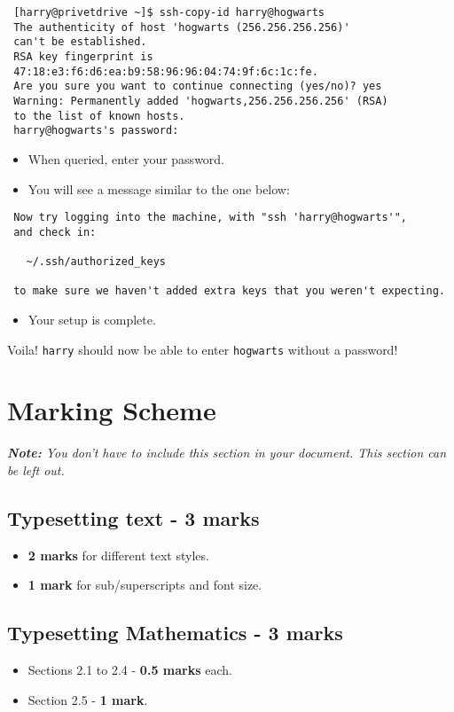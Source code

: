 \documentclass[a4paper,10pt,titlepage]{article}
\begin{document}
\begin{verbatim}
 [harry@privetdrive ~]$ ssh-copy-id harry@hogwarts
 The authenticity of host 'hogwarts (256.256.256.256)'
 can't be established.
 RSA key fingerprint is
 47:18:e3:f6:d6:ea:b9:58:96:96:04:74:9f:6c:1c:fe.
 Are you sure you want to continue connecting (yes/no)? yes
 Warning: Permanently added 'hogwarts,256.256.256.256' (RSA)
 to the list of known hosts.
 harry@hogwarts's password:
\end{verbatim}

\begin{itemize}
\item When queried, enter your password.
\item You will see a message similar to the one below:
\end{itemize}

\begin{verbatim}
 Now try logging into the machine, with "ssh 'harry@hogwarts'",
 and check in:

   ~/.ssh/authorized_keys

 to make sure we haven't added extra keys that you weren't expecting.

\end{verbatim}

\begin{itemize}
\item Your setup is complete.
\end{itemize}

Voila! \texttt{harry} should now be able to enter \texttt{hogwarts} without a password!

\newpage
\section{Marking Scheme}
\textit{\textbf{Note:} You don't have to include this section in your
document. This section can be left out.}
\subsection{Typesetting text - 3 marks}
\begin{itemize}
 \item \textbf{2 marks} for different text styles.
 \item \textbf{1 mark} for sub/superscripts and font size.
\end{itemize}

\subsection{Typesetting Mathematics - 3 marks}
\begin{itemize}
 \item Sections 2.1 to 2.4 - \textbf{0.5 marks} each.
 \item Section 2.5 - \textbf{1 mark}.
\end{itemize}
\end{document}
